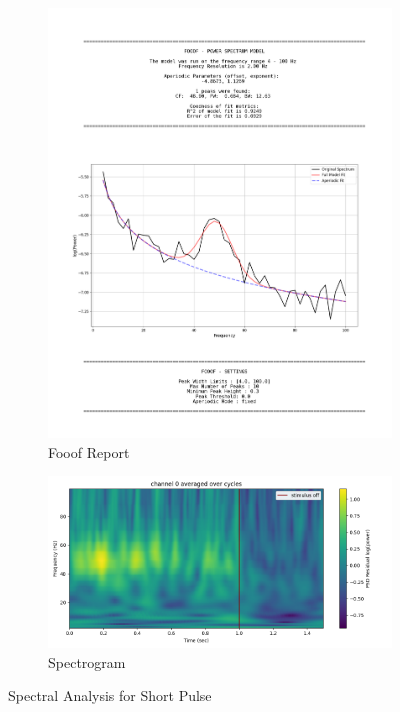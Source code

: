 \documentclass[12pt, letterpaper]{article}
\begin{document}
\begin{figure}[H]
    \centering
    \begin{subfigure}{.75\textwidth}
      \centering
      \includegraphics[width=\textwidth]{output/short-psd}
      \caption{Fooof Report}
      \label{fig:short-psd}
    \end{subfigure}
    \begin{subfigure}{.75\textwidth}
      \centering
      \includegraphics[width=\textwidth]{output/short-spectrogram}
      \caption{Spectrogram}
      \label{fig:short-spectrogram}
    \end{subfigure}
    \caption{Spectral Analysis for Short Pulse}
\end{figure}
\end{document}
